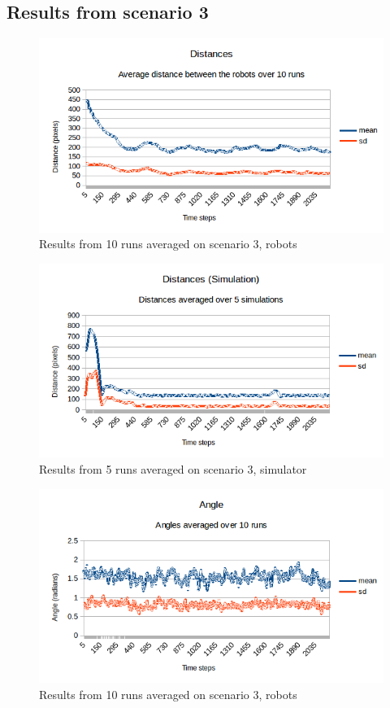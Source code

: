 \subsection{Results from scenario 3}
\label{sec:res3}
\begin{figure}[h]
\begin{center}
\includegraphics[width=0.8\linewidth]{figs/runs/3pdist}
\end{center}
\caption[3. Distances, robots]{Results from 10 runs averaged on scenario 3, robots}
\label{fig:res3pdist}
\end{figure}
\begin{figure}[h]
\begin{center}
\includegraphics[width=0.8\linewidth]{figs/runs/3sdist}
\end{center}
\caption[3. Distances, simulation]{Results from 5 runs averaged on scenario 3, simulator}
\label{fig:res3sdist}
\end{figure}
\begin{figure}[h]
\begin{center}
\includegraphics[width=0.8\linewidth]{figs/runs/3pangle}
\end{center}
\caption[3. Angle, robots]{Results from 10 runs averaged on scenario 3, robots}
\label{fig:res3pang}
\end{figure}
